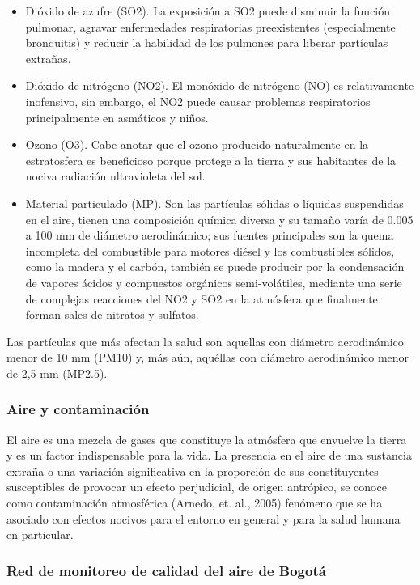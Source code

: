 \begin{itemize}
	\item Dióxido de azufre (SO2). La exposición a SO2 puede disminuir la función pulmonar, agravar enfermedades respiratorias preexistentes (especialmente bronquitis) y reducir la habilidad de los pulmones para liberar partículas extrañas.
	\item Dióxido de nitrógeno (NO2). El monóxido de nitrógeno (NO) es relativamente inofensivo, sin embargo, el NO2 puede causar problemas respiratorios principalmente en asmáticos y niños.
	\item Ozono (O3). Cabe anotar que el ozono producido naturalmente en la estratosfera es beneficioso porque protege a la tierra y sus habitantes de la nociva radiación ultravioleta del sol.
	\item Material particulado (MP). Son las partículas sólidas o líquidas suspendidas en el aire, tienen una composición química diversa y su tamaño varía de 0.005 a 100 mm de diámetro aerodinámico; sus
	fuentes principales son la quema incompleta del combustible para motores diésel y los combustibles sólidos, como la madera y el carbón, también se puede producir por la condensación de vapores ácidos y compuestos orgánicos semi-volátiles, mediante una serie de complejas reacciones del NO2 y SO2 en la atmósfera que finalmente forman sales de nitratos y sulfatos.
\end{itemize}

Las partículas que más afectan la salud son aquellas con diámetro aerodinámico menor de 10 mm (PM10) y, más aún, aquéllas con diámetro aerodinámico menor de 2,5 mm (MP2.5).

\subsubsection{Aire y contaminación}

El aire es una mezcla de gases que constituye la atmósfera que envuelve la tierra y es un factor indispensable para la vida. 
La presencia en el aire de una sustancia extraña o una variación significativa en la proporción de sus constituyentes susceptibles de provocar un efecto perjudicial, de origen antrópico, se conoce como contaminación atmosférica (Arnedo, et. al., 2005) fenómeno que se ha asociado con efectos nocivos para el entorno en general y para la salud humana en particular.

\subsubsection{Red de monitoreo de calidad del aire de Bogotá}

